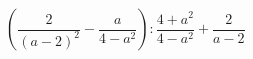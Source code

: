 \begin{ex}[type=expression]
	\begin{condition}
		\( \left( \dfrac{2}{(a-2)^2}-\dfrac{a}{4-a^2}\right):\dfrac{4+a^2}{4-a^2}+\dfrac{2}{a-2} \)
	\end{condition}
\end{ex}